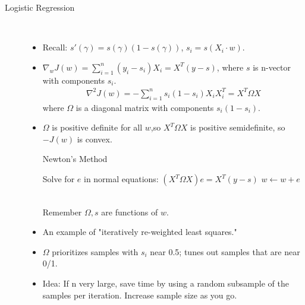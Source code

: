 \documentclass[10pt]{article}
\begin{document}
\begin{description}
		\item[Logistic Regression]
			\
			\begin{itemize}
				\item Recall: $s'(\gamma) = s(\gamma)(1 - s(\gamma))$, $s_{i} = s(X_{i}\cdot w)$.
				\item $\nabla_{w}J(w) = \sum_{i=1}^{n}(y_{i} - s_{i})X_{i} = X^{T}(y - s)$, where $s$ is n-vector with components $s_{i}$.
					\begin{align*}
						\nabla^{2}J(w) = -\sum_{i=1}^{n}s_{i}(1 - s_{i})X_{i}X_{i}^{T} = X^{T}\Omega X
					\end{align*}
				where $\Omega$ is a diagonal matrix with components $s_{i}(1 - s_{i})$.
				\item $\Omega$ is positive definite for all $w$,so $X^{T}\Omega X$ is positive semidefinite, so $-J(w)$ is convex.
					\begin{algorithm*}
					\caption{Newton's Method}
					\begin{algorithmic}
						\State Solve for $e$ in normal equations: $(X^{T}\Omega X)e = X^{T}(y - s)$
						\State $w \leftarrow w + e$
						\EndWhile
					\end{algorithmic}
				\end{algorithm*}\\
				Remember $\Omega, s$ are functions of $w$.
				\item An example of "iteratively re-weighted least squares."
				\item $\Omega$ prioritizes samples with $s_{i}$ near 0.5; tunes out samples that are near 0/1.
				\item Idea: If n very large, save time by using a random subsample of the samples per iteration. Increase sample size as you go.
			\end{itemize}
			

\end{description}
\end{document}
